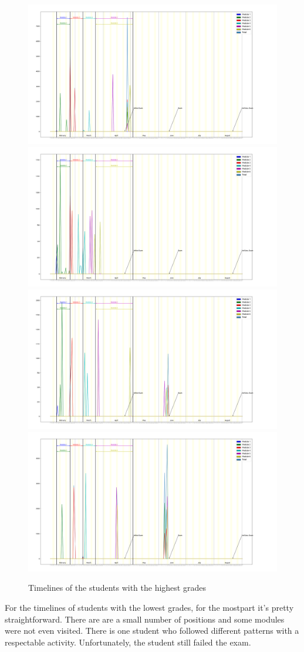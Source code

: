 \documentclass[a4paper,11pt]{report}
\numberwithin{figure}{section} %
\begin{document}
      \begin{figure}[H]
      \centering
  	  \includegraphics[width=.48\linewidth]{images/good_timeline_1747564.png}
  	  \includegraphics[width=.48\linewidth]{images/good_timeline_1793969.png}
      \\
      \includegraphics[width=.48\linewidth]{images/good_timeline_1942114.png}
      \includegraphics[width=.48\linewidth]{images/good_timeline_3554348.png}
      \caption{Timelines of the students with the highest grades}
      \label{fig:tm2}
      \end{figure}

    For the timelines of students with the lowest grades, for the mostpart it's pretty straightforward.
    There are are a small number of positions and some modules were not even visited.
    There is one student who followed different patterns with a respectable activity.
    Unfortunately, the student still failed the exam.\\
\end{document}
